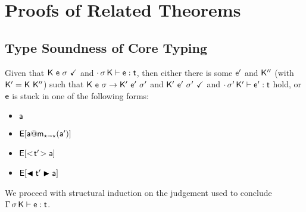 \documentclass[acmlarge, anonymous, authordraft, review]{acmart} %
\begin{document}
% 

\section{Proofs of Related Theorems}

\subsection*{Type Soundness of Core \kafka Typing}

Given that $\WFp\K{\e~\s}$ and $\EnvType\cdot\s\K\e\t$, then either there is some $\ep$ and ${{\sf{K''}}}$ (with ${{\sf{K'}}} = {\sf{K}}~{{\sf{K''}}}$) 
such that $\Reduce \K\e\s \Kp\ep\sp$ and $\WFp\Kp{\ep~\sp}$ and $\EnvType\cdot\sp\Kp\ep\t$ hold, 
or $\e$ is stuck in one of the following forms:
\begin{itemize} 
\item $\a$
\item $\EE[\DynCall\a\m{\ap}]$
\item $\EE[\SubCast\tp\a]$
\item $\EE[\BehCast\tp\a]$
\end{itemize}

We proceed with structural induction on the judgement used to conclude $\EnvType\Env\s\K\e\t$. 
\end{document}
